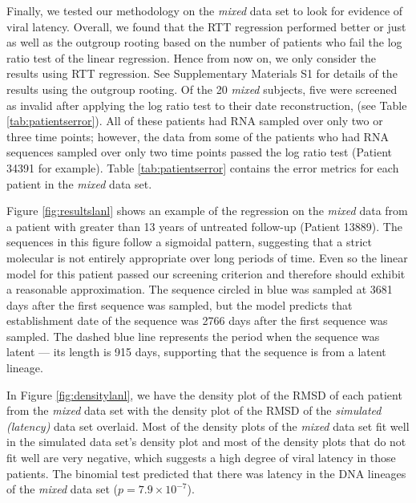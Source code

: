 \documentclass{bmcart}
\begin{document}

Finally, we tested our methodology on the {\em mixed} data set to look for evidence of viral latency.
Overall, we found that the RTT regression performed better or just as well as the outgroup rooting based on the number of patients who fail the log ratio test of the linear regression.
Hence from now on, we only consider the results using RTT regression.
See Supplementary Materials S1 for details of the results using the outgroup rooting.
Of the 20 \emph{mixed} subjects, five were screened as invalid after applying the log ratio test to their date reconstruction, (see Table \ref{tab:patientserror}).
All of these patients had RNA sampled over only two or three time points; however, the data from some of the patients who had RNA sequences sampled over only two time points passed the log ratio test (Patient 34391 for example).
Table \ref{tab:patientserror} contains the error metrics for each patient in the \emph{mixed} data set.

Figure \ref{fig:resultslanl} shows an example of the regression on the \emph{mixed} data from a patient with greater than 13 years of untreated follow-up (Patient 13889).
The sequences in this figure follow a sigmoidal pattern, suggesting that a strict molecular is not entirely appropriate over long periods of time.
Even so the linear model for this patient passed our screening criterion and therefore should exhibit a reasonable approximation.
The sequence circled in blue was sampled at 3681 days after the first sequence was sampled, but the model predicts that  establishment date of the sequence was 2766 days after the first sequence was sampled.
The dashed blue line represents the period when the sequence was latent --- its length is 915 days, supporting that the sequence is from a latent lineage.

In Figure \ref{fig:densitylanl}, we have the density plot of the RMSD of each patient from the \emph{mixed} data set with the density plot of the RMSD of the \emph{simulated (latency)} data set overlaid.
Most of the density plots of the \emph{mixed} data set fit well in the simulated data set's density plot and most of the density plots that do not fit well are very negative, which suggests a high degree of viral latency in those patients.
The binomial test predicted that there was latency in the DNA lineages of the \emph{mixed} data set ($p=7.9 \times 10^{-7}$).
\end{document}
